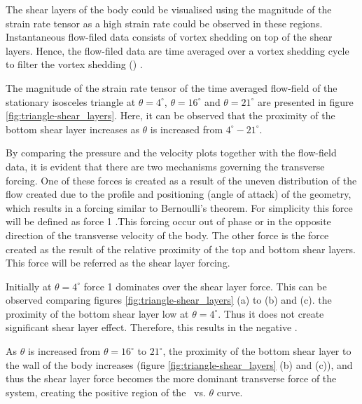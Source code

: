 The shear layers of the body could be visualised using the magnitude of the strain rate tensor as a high strain rate could be observed in these regions. Instantaneous flow-filed data consists of vortex shedding on top of the shear layers. Hence, the flow-filed data are time averaged over a vortex shedding cycle to filter the vortex shedding () . 

The magnitude of the strain rate tensor of the time averaged flow-field of the stationary isosceles triangle at  $\theta=4^{\circ}$, $\theta=16^{\circ}$ and $\theta=21^{\circ}$ are presented in figure \ref{fig:triangle-shear_layers}. Here, it can be observed that the proximity of the bottom shear layer increases as $\theta$ is increased from $4^{\circ}-21^{\circ}$. 


By comparing the pressure and the velocity plots together with the flow-field data, it is evident that there are two mechanisms governing the transverse forcing. One of these forces is created as a result of the uneven distribution of the flow created due to the profile and  positioning (angle of attack) of the geometry, which results in a forcing similar to Bernoulli's theorem. For simplicity this force will be defined as force 1 .This forcing occur out of phase or in the opposite direction of the transverse velocity of the body. The other force is the force created as the result of the relative proximity of the top and bottom shear layers. This force will be referred as the shear layer forcing.




Initially at $\theta= 4^{\circ}$ force 1 dominates over the shear layer force. This can be observed comparing figures \ref{fig:triangle-shear_layers} (a) to (b) and (c). the proximity of the bottom shear layer low at $\theta= 4^{\circ}$. Thus it does not create significant shear layer effect. Therefore, this results in the negative \cy.   

As $\theta$ is increased from $\theta=16^{\circ}$ to $21^{\circ}$, the proximity of the bottom shear layer to the wall of the body increases (figure \ref{fig:triangle-shear_layers} (b) and (c)), and thus the shear layer force becomes the more dominant transverse force of the system, creating the positive region of the \cy\ vs. $\theta$ curve.

 
 
 



